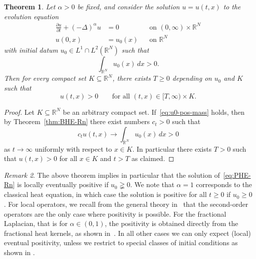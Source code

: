 \documentclass[a4paper, reqno]{amsart}
\numberwithin{equation}{section}
\theoremstyle{plain}
\newtheorem{theorem}{Theorem}[section]
\theoremstyle{definition}
\theoremstyle{remark}
\newtheorem{remark}[theorem]{Remark}
\newcommand{\RR}{\mathbb{R}}
\begin{document}
\begin{theorem}
  Let $\alpha > 0$ be fixed, and consider the solution $u = u(t,x)$ to the evolution equation
  \begin{equation}
    \label{eq:PHE-Rn}
    \begin{aligned}
      \frac{\partial u}{\partial t} + (-\Delta)^\alpha u & = 0
                                                         &          & \text{on } (0, \infty) \times \RR^N \\
      u(0, x)                                            & = u_0(x)
                                                         &          & \text{on } \RR^N
    \end{aligned}
  \end{equation}
  with initial datum $u_0 \in L^1 \cap L^2(\RR^N)$ such that
  \begin{equation}
    \label{eq:u0-pos-mass}
    \int_{\RR^N} u_0(x) \,dx>0.
  \end{equation}
  Then for every compact set $K \subseteq \RR^N$, there exists $T \geq 0$ depending on $u_0$ and $K$ such that
  \begin{equation*}
    u(t,x) > 0 \qquad \text{for all } (t,x)\in[T,\infty)\times K.
  \end{equation*}
\end{theorem}
\begin{proof}
  Let $K \subseteq \RR^N$ be an arbitrary compact set. If~\eqref{eq:u0-pos-mass} holds, then by Theorem~\ref{thm:BHE-Rn} there exist numbers $c_t > 0$ such that
  \begin{equation*}
    c_t u(t,x) \longrightarrow \int_{\RR^N} u_0(x) \,dx > 0
  \end{equation*}
  as $t \to \infty$ uniformly with respect to  $x\in K$. In particular there exists $T>0$ such that $u(t,x)>0$ for all $x\in K$ and $t>T$ as claimed.
\end{proof}
\begin{remark}
  The above theorem implies in particular that the solution of~\eqref{eq:PHE-Rn} is locally eventually positive if $u_0\gneqq 0$. We note that $\alpha=1$ corresponds to the classical heat equation, in which case the solution is positive for all $t\geq 0$ if $u_0\geq 0$. For local operators, we recall from the general theory in~\cite[Theorem~2.1]{ABR90} that the second-order operators are the only case where positivity is possible. For the fractional Laplacian, that is for $\alpha\in (0,1)$, the positivity is obtained directly from the fractional heat kernels, as shown in~\cite[Section 2]{VAZ}. In all other cases we can only expect (local) eventual positivity, unless we restrict to special classes of initial conditions as shown in \cite{GMO}.
\end{remark}
\end{document}
